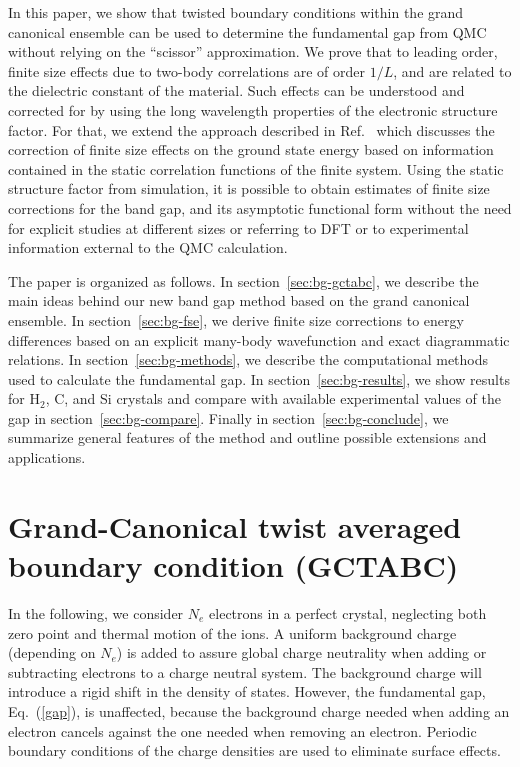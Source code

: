 In this paper, we show that twisted boundary conditions within the grand canonical ensemble
can be used
to  determine the fundamental gap from QMC without relying on the ``scissor'' approximation.
We prove that to leading order, finite size effects due to two-body correlations are of order $1/L$,
and are related to the dielectric constant of the material. Such effects
can be understood and corrected for by using
the long wavelength properties of the electronic
structure factor. 
For that, we extend the approach described in Ref.~\cite{fse,finitesize} 
which discusses the correction
of finite size effects on the ground state energy
based on information contained in the static correlation functions of the finite system.
Using the static structure factor from simulation, it is possible to obtain estimates of finite size corrections 
for the band gap, and its asymptotic functional form 
without the need for
explicit studies at different sizes or referring to DFT or to experimental information
external to the QMC calculation.

The paper is organized as follows. In section~\ref{sec:bg-gctabc}, we describe the main ideas behind our new band gap method based on the grand canonical ensemble. In section~\ref{sec:bg-fse}, we derive finite size corrections to energy differences based on an explicit many-body wavefunction and exact diagrammatic relations. In section~\ref{sec:bg-methods}, we describe the computational methods used to calculate the fundamental gap. In section~\ref{sec:bg-results}, we show results for H$_2$, C, and Si crystals
and compare with available experimental values of the gap in section~\ref{sec:bg-compare}.
Finally in section~\ref{sec:bg-conclude}, we summarize general features of the method
 and outline possible extensions and applications.

\section{Grand-Canonical twist averaged boundary condition (GCTABC)\label{sec:bg-gctabc}}

In the following, we consider $N_e$ electrons in a perfect crystal,
neglecting both zero point  and thermal motion of the ions.
A uniform background charge (depending on $N_e$) is added to assure global 
charge neutrality when adding or subtracting electrons to a charge neutral system.
The background charge will introduce a rigid shift in the density of states. However, the fundamental gap, Eq.~(\ref{gap}), is unaffected,
because the background
charge needed when adding an electron cancels against the one needed when removing an electron.
Periodic boundary conditions of the charge densities are used to eliminate surface effects.

